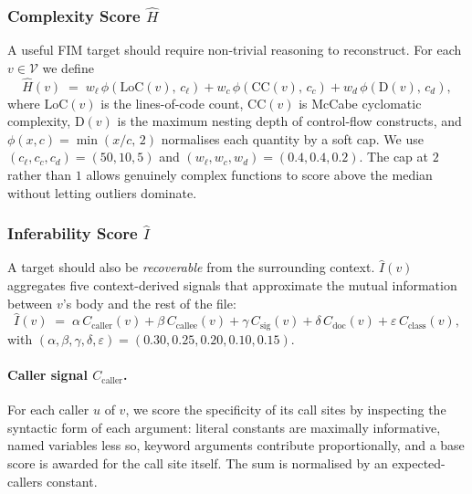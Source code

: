 \subsubsection{Complexity Score $\hat{H}$}
\label{sec:method:complexity}

A useful FIM target should require non-trivial reasoning to reconstruct.
For each $v \in \mathcal{V}$ we define
%
\begin{equation}
  \hat{H}(v) \;=\; w_{\ell}\,\phi\!\left(\mathrm{LoC}(v),\,c_{\ell}\right)
            + w_{c}\,\phi\!\left(\mathrm{CC}(v),\,c_{c}\right)
            + w_{d}\,\phi\!\left(\mathrm{D}(v),\,c_{d}\right),
  \label{eq:complexity}
\end{equation}
%
where $\mathrm{LoC}(v)$ is the lines-of-code count, $\mathrm{CC}(v)$ is
McCabe cyclomatic complexity, $\mathrm{D}(v)$ is the maximum nesting depth
of control-flow constructs, and $\phi(x, c) = \min(x / c,\, 2)$ normalises
each quantity by a soft cap. We use $(c_{\ell}, c_{c}, c_{d}) = (50, 10, 5)$
and $(w_{\ell}, w_{c}, w_{d}) = (0.4, 0.4, 0.2)$. The cap at $2$ rather than
$1$ allows genuinely complex functions to score above the median without
letting outliers dominate.

\subsubsection{Inferability Score $\hat{I}$}
\label{sec:method:inferability}

A target should also be \emph{recoverable} from the surrounding context.
$\hat{I}(v)$ aggregates five context-derived signals that approximate the
mutual information between $v$'s body and the rest of the file:
%
\begin{equation}
  \hat{I}(v) \;=\; \alpha\,C_{\mathrm{caller}}(v)
              + \beta\,C_{\mathrm{callee}}(v)
              + \gamma\,C_{\mathrm{sig}}(v)
              + \delta\,C_{\mathrm{doc}}(v)
              + \varepsilon\,C_{\mathrm{class}}(v),
  \label{eq:inferability}
\end{equation}
%
with $(\alpha,\beta,\gamma,\delta,\varepsilon) = (0.30, 0.25, 0.20, 0.10, 0.15)$.

\paragraph{Caller signal $C_{\mathrm{caller}}$.}
For each caller $u$ of $v$, we score the specificity of its call sites by
inspecting the syntactic form of each argument: literal constants are
maximally informative, named variables less so, keyword arguments contribute
proportionally, and a base score is awarded for the call site itself. The
sum is normalised by an expected-callers constant.

